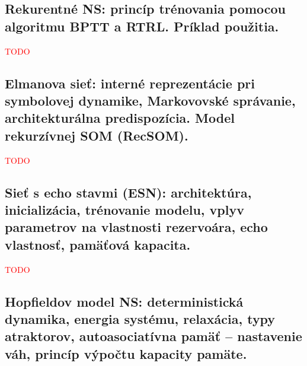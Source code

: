 \documentclass{article}
\numberwithin{equation}{section} %
\begin{document}
\subsection{Rekurentné NS: princíp trénovania pomocou algoritmu BPTT a RTRL. Príklad použitia.}
\textcolor{red}{TODO}


\subsection{Elmanova sieť: interné reprezentácie pri symbolovej dynamike, Markovovské správanie, architekturálna predispozícia. Model rekurzívnej SOM (RecSOM).}
\textcolor{red}{TODO}


\subsection{Sieť s echo stavmi (ESN): architektúra, inicializácia, trénovanie modelu, vplyv parametrov na vlastnosti rezervoára, echo vlastnosť, pamäťová kapacita.}
\textcolor{red}{TODO}


\subsection{Hopfieldov model NS: deterministická dynamika, energia systému, relaxácia, typy atraktorov, autoasociatívna pamäť – nastavenie váh, princíp výpočtu kapacity pamäte.}
\end{document}
